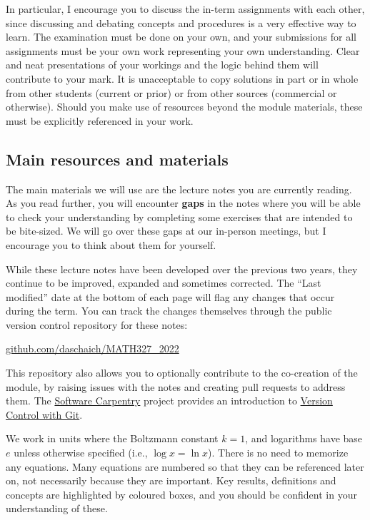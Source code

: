 In particular, I encourage you to discuss the in-term assignments with each other, since discussing and debating concepts and procedures is a very effective way to learn.
The examination must be done on your own, and your submissions for all assignments must be your own work representing your own understanding.
Clear and neat presentations of your workings and the logic behind them will contribute to your mark.
It is unacceptable to copy solutions in part or in whole from other students (current or prior) or from other sources (commercial or otherwise).
Should you make use of resources beyond the module materials, these must be explicitly referenced in your work.



\subsection*{Main resources and materials}
The main materials we will use are the lecture notes you are currently reading.
As you read further, you will encounter \textbf{gaps} in the notes where you will be able to check your understanding by completing some exercises that are intended to be bite-sized.
We will go over these gaps at our in-person meetings, but I encourage you to think about them for yourself.

While these lecture notes have been developed over the previous two years, they continue to be improved, expanded and sometimes corrected.
The ``Last modified'' date at the bottom of each page will flag any changes that occur during the term.
You can track the changes themselves through the public version control repository for these notes: \\
\centerline{\href{https://github.com/daschaich/MATH327_2022}{github.com/daschaich/MATH327\_2022}}
This repository also allows you to optionally contribute to the co-creation of the module, by raising issues with the notes and creating pull requests to address them.
The \href{https://software-carpentry.org}{Software Carpentry} project provides an introduction to \href{https://swcarpentry.github.io/git-novice/}{Version Control with Git}.

We work in units where the Boltzmann constant $k = 1$, and logarithms have base $e$ unless otherwise specified (i.e., $\log x = \ln x$).
There is no need to memorize any equations.
Many equations are numbered so that they can be referenced later on, not necessarily because they are important.
Key results, definitions and concepts are highlighted by coloured boxes, and you should be confident in your understanding of these.


